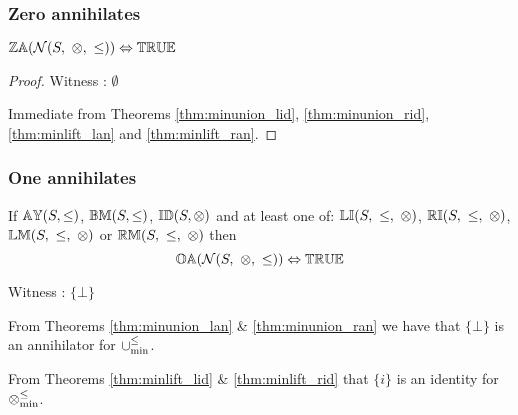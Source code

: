 \documentclass[../Summary.tex]{subfiles}
\begin{document}
\subsubsection{Zero annihilates}

\begin{theorem} \label{thm:N_zo}
${\mathbb{ZA}}(\mathcal{N}(S,\ \otimes,\ \leq)) \Leftrightarrow {\mathbb{TRUE}}$
\end{theorem}

\begin{proof}

\vspace{0.5em}
Witness : $\emptyset$

\vspace{0.5em}
Immediate from Theorems \ref{thm:minunion_lid}, \ref{thm:minunion_rid}, \ref{thm:minlift_lan} and \ref{thm:minlift_ran}.
\end{proof}





\subsubsection{One annihilates}

\begin{theorem} \label{thm:N_oa}
If ${\mathbb{AY}}(S,\leq)$, ${\mathbb{BM}}(S,\leq)$, ${\mathbb{ID}}(S,\otimes)$ and at least one of: $\propname{LI}(S,\ \leq,\ \otimes)$, $\propname{RI}(S,\ \leq,\ \otimes)$, $\propname{LM}(S,\ \leq,\ \otimes)$ or $\propname{RM}(S,\ \leq,\ \otimes)$ then
\begin{equation*}
{\mathbb{OA}}(\mathcal{N}(S,\ \otimes,\ \leq)) \Leftrightarrow {\mathbb{TRUE}}
\end{equation*}
\end{theorem}

\proof

\vspace{0.5em}
Witness : $\{ \bot \}$

\vspace{0.5em}

From Theorems \ref{thm:minunion_lan} \& \ref{thm:minunion_ran} we have that $\{ \bot \}$ is an annihilator for $\mathbin{\cup_{\min}^{\leq}}$.

\vspace{0.5em}

From Theorems \ref{thm:minlift_lid} \& \ref{thm:minlift_rid} that $\{ i \}$ is an identity for $\mathbin{\otimes_{\min}^{\leq}}$.

\vspace{0.5em}
\end{document}
